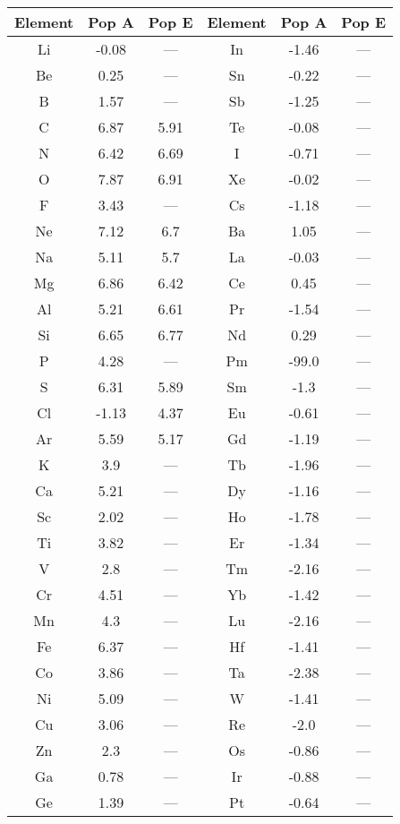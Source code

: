 \begin{table}
\centering
\begin{tabular}{c|cc||c|cc}
  \hline
  Element & Pop A & Pop E & Element & Pop A & Pop E \\
  \hline
  \hline
  Li & -0.08 & --- & In & -1.46 & --- \\
  Be & 0.25 & --- & Sn & -0.22 & --- \\
  B & 1.57 & --- & Sb & -1.25 & --- \\
  C & 6.87 & 5.91 & Te & -0.08 & --- \\
  N & 6.42 & 6.69 & I & -0.71 & --- \\
  O & 7.87 & 6.91 & Xe & -0.02 & --- \\
  F & 3.43 & --- & Cs & -1.18 & --- \\
  Ne & 7.12 & 6.7 & Ba & 1.05 & --- \\
  Na & 5.11 & 5.7 & La & -0.03 & --- \\
  Mg & 6.86 & 6.42 & Ce & 0.45 & --- \\
  Al & 5.21 & 6.61 & Pr & -1.54 & --- \\
  Si & 6.65 & 6.77 & Nd & 0.29 & --- \\
  P & 4.28 & --- & Pm & -99.0 & --- \\
  S & 6.31 & 5.89 & Sm & -1.3 & --- \\
  Cl & -1.13 & 4.37 & Eu & -0.61 & --- \\
  Ar & 5.59 & 5.17 & Gd & -1.19 & --- \\
  K & 3.9 & --- & Tb & -1.96 & --- \\
  Ca & 5.21 & --- & Dy & -1.16 & --- \\
  Sc & 2.02 & --- & Ho & -1.78 & --- \\
  Ti & 3.82 & --- & Er & -1.34 & --- \\
  V & 2.8 & --- & Tm & -2.16 & --- \\
  Cr & 4.51 & --- & Yb & -1.42 & --- \\
  Mn & 4.3 & --- & Lu & -2.16 & --- \\
  Fe & 6.37 & --- & Hf & -1.41 & --- \\
  Co & 3.86 & --- & Ta & -2.38 & --- \\
  Ni & 5.09 & --- & W & -1.41 & --- \\
  Cu & 3.06 & --- & Re & -2.0 & --- \\
  Zn & 2.3 & --- & Os & -0.86 & --- \\
  Ga & 0.78 & --- & Ir & -0.88 & --- \\
  Ge & 1.39 & --- & Pt & -0.64 & --- \\

\end{tabular}
\end{table}
